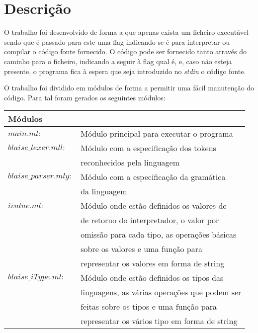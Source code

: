 \chapter{Descrição}

O trabalho foi desenvolvido de forma a que apenas exista um ficheiro executável sendo que é passado para este uma flag indicando se é para interpretar ou compilar o código fonte fornecido. O código pode ser fornecido tanto através do caminho para o ficheiro, indicando a	seguir à flag qual é, e, caso não esteja presente, o programa fica à espera que seja introduzido no \emph{stdin} o código fonte.

O trabalho foi dividido em módulos de forma a permitir uma fácil manutenção do código. 
Para tal foram gerados os seguintes módulos:

\begin{tabular}{|l|l|}
\hline
\multicolumn{2}{|l|}{\cellcolor{grey}Módulos}\\
\hline
$main.ml:$				& Módulo principal para executar o programa \\
\hline
$blaise\_lexer.mll:$	& Módulo com a especificação dos tokens \\
						& reconhecidos pela linguagem \\
\hline
$blaise\_parser.mly:$	& Módulo com a especificação da gramática \\
						& da linguagem \\
\hline
$ivalue.ml:$			& Módulo onde estão definidos os valores de \\
						& de retorno do interpretador, o valor por \\
						& omissão para cada tipo, as operações básicas \\
						& sobre os valores e uma função para \\
						& representar os valores em forma de string \\
\hline
$blaise\_iType.ml:$		& Módulo onde estão definidos os tipos das \\
						& linguagens, as várias operações que podem ser \\
						& feitas sobre os tipos e uma função para \\
						& representar os vários tipo em forma de string \\
\hline
\end{tabular}

